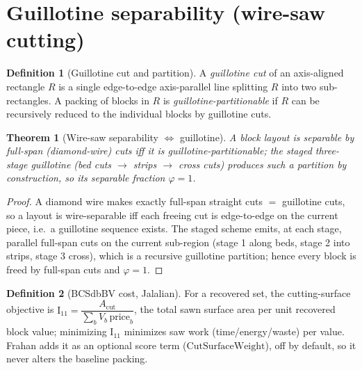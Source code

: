 \documentclass[11pt]{article}
\theoremstyle{definition}\newtheorem{definition}{Definition}[section]
\theoremstyle{plain}\newtheorem{theorem}{Theorem}[section]
\begin{document}
\section{Guillotine separability (wire-saw cutting)}
\begin{definition}[Guillotine cut and partition]
A \emph{guillotine cut} of an axis-aligned rectangle $R$ is a single edge-to-edge axis-parallel line splitting
$R$ into two sub-rectangles. A packing of blocks in $R$ is \emph{guillotine-partitionable} if $R$ can be
recursively reduced to the individual blocks by guillotine cuts.
\end{definition}
\begin{theorem}[Wire-saw separability $\Leftrightarrow$ guillotine]\label{thm:guillotine}
A block layout is separable by full-span (diamond-wire) cuts iff it is guillotine-partitionable; the staged
three-stage guillotine (bed cuts $\to$ strips $\to$ cross cuts) produces such a partition by construction, so
its separable fraction $\varphi=1$.
\end{theorem}
\begin{proof}
A diamond wire makes exactly full-span straight cuts $=$ guillotine cuts, so a layout is wire-separable iff
each freeing cut is edge-to-edge on the current piece, i.e.\ a guillotine sequence exists. The staged scheme
emits, at each stage, parallel full-span cuts on the current sub-region (stage 1 along beds, stage 2 into
strips, stage 3 cross), which is a recursive guillotine partition; hence every block is freed by full-span
cuts and $\varphi=1$.
\end{proof}
\begin{definition}[BCSdbBV cost, Jalalian]
For a recovered set, the cutting-surface objective is $\mathrm{I}_{11}=\dfrac{A_{\mathrm{cut}}}{\sum_b V_b\,\mathrm{price}_b}$,
the total sawn surface area per unit recovered block value; minimizing $\mathrm{I}_{11}$ minimizes saw work
(time/energy/waste) per value. Frahan adds it as an optional score term ($\mathrm{CutSurfaceWeight}$),
off by default, so it never alters the baseline packing.
\end{definition}
\end{document}

